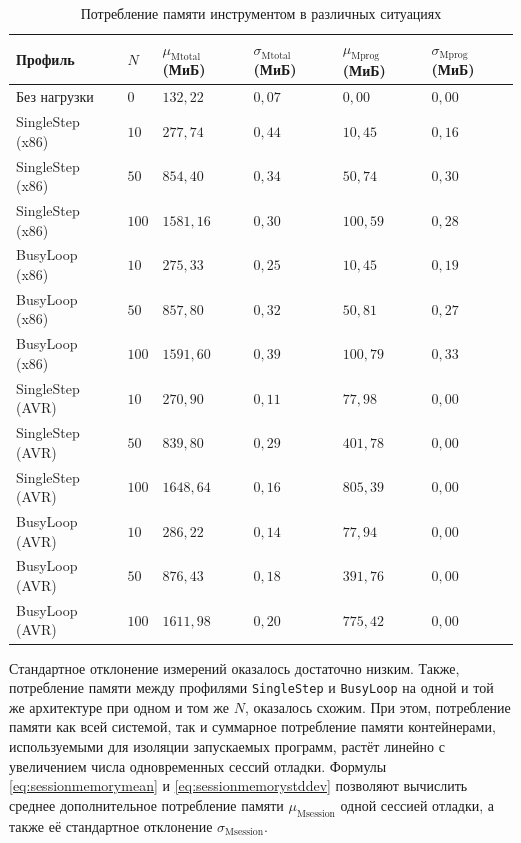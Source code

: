 \documentclass[a4paper,article,14pt]{extarticle}
\begin{document}
\begin{table}[ht]
\small
    \begin{tabular}{|p{3cm}|p{1cm}|p{2.5cm}|p{2.5cm}|p{2.5cm}|p{2.5cm}|}
    \hline
    Профиль & $N$ & $\mu_\mathrm{Mtotal}$ (МиБ) & $\sigma_\mathrm{Mtotal}$ (МиБ) &
    $\mu_\mathrm{Mprog}$ (МиБ) & $\sigma_\mathrm{Mprog}$ (МиБ) \\
    \hline
Без нагрузки & $0$ & $132{,}22$ & $0{,}07$ & $0{,}00$ & $0{,}00$ \\ \hline
SingleStep (x86) & $10$ & $277{,}74$ & $0{,}44$ & $10{,}45$ & $0{,}16$ \\ \hline
SingleStep (x86) & $50$ & $854{,}40$ & $0{,}34$ & $50{,}74$ & $0{,}30$ \\ \hline
SingleStep (x86) & $100$ & $1581{,}16$ & $0{,}30$ & $100{,}59$ & $0{,}28$ \\ \hline
BusyLoop (x86) & $10$ & $275{,}33$ & $0{,}25$ & $10{,}45$ & $0{,}19$ \\ \hline
BusyLoop (x86) & $50$ & $857{,}80$ & $0{,}32$ & $50{,}81$ & $0{,}27$ \\ \hline
BusyLoop (x86) & $100$ & $1591{,}60$ & $0{,}39$ & $100{,}79$ & $0{,}33$ \\ \hline
SingleStep (AVR) & $10$ & $270{,}90$ & $0{,}11$ & $77{,}98$ & $0{,}00$ \\ \hline
SingleStep (AVR) & $50$ & $839{,}80$ & $0{,}29$ & $401{,}78$ & $0{,}00$ \\ \hline
SingleStep (AVR) & $100$ & $1648{,}64$ & $0{,}16$ & $805{,}39$ & $0{,}00$ \\ \hline
BusyLoop (AVR) & $10$ & $286{,}22$ & $0{,}14$ & $77{,}94$ & $0{,}00$ \\ \hline
BusyLoop (AVR) & $50$ & $876{,}43$ & $0{,}18$ & $391{,}76$ & $0{,}00$ \\ \hline
BusyLoop (AVR) & $100$ & $1611{,}98$ & $0{,}20$ & $775{,}42$ & $0{,}00$ \\ \hline
    \end{tabular}
\caption{\label{table:memorymeasurements}Потребление памяти инструментом в различных ситуациях}
\normalsize
\end{table}

Стандартное отклонение измерений оказалось достаточно низким. Также, потребление памяти между профилями \texttt{SingleStep} и \texttt{BusyLoop} на одной и той же архитектуре при одном и том же $N$, оказалось схожим. При этом, потребление памяти как всей системой, так и суммарное потребление памяти контейнерами, используемыми для изоляции запускаемых программ, растёт линейно с увеличением числа одновременных сессий отладки. Формулы \ref{eq:sessionmemorymean} и \ref{eq:sessionmemorystddev} позволяют вычислить среднее дополнительное потребление памяти $\mu_\mathrm{Msession}$ одной сессией отладки, а также её стандартное отклонение $\sigma_\mathrm{Msession}$.
\end{document}
